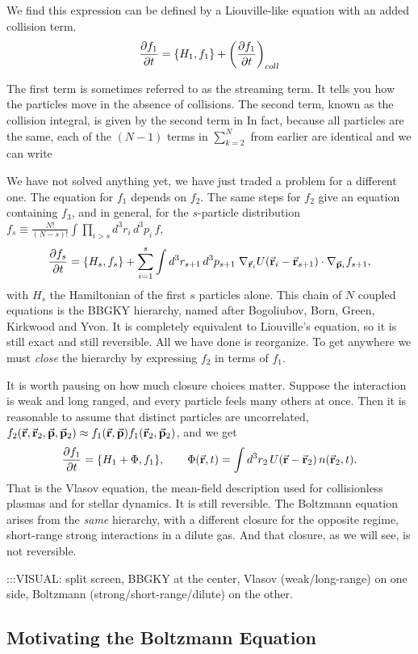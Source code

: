 We find this expression can be defined by a Liouville-like equation with an added collision term.
\[
\pdv{f_1}{t} = \pb{H_1}{f_1} + \left(\pdv{f_1}{t}  \right)_{coll}
  \]

  The first term is sometimes referred to as the streaming term. It tells you how the
particles move in the absence of collisions. The second term, known as the collision
integral, is given by the second term in In fact, because all particles are the
same, each of the $(N-1)$ terms in $\sum^N_{k=2}$ from earlier are identical and we can write

We have not solved anything yet, we have just traded a problem for a different one. The equation for $f_1$ depends on $f_2$. The same steps for $f_2$ give an equation containing $f_3$, and in general, for the $s$-particle distribution $f_s\equiv\frac{N!}{(N-s)!}\int\prod_{i>s}d^3r_i\,d^3p_i\,f$,
\[
\pdv{f_s}{t} = \pb{H_s}{f_s} + \sum_{i=1}^{s}\int d^3r_{s+1}\,d^3p_{s+1}\;\nabla_{\va r_i}U(\va r_i-\va r_{s+1})\cdot\nabla_{\va p_i}f_{s+1},
\]
with $H_s$ the Hamiltonian of the first $s$ particles alone. This chain of $N$ coupled equations is the BBGKY hierarchy, named after Bogoliubov, Born, Green, Kirkwood and Yvon. It is completely equivalent to Liouville's equation, so it is still exact and still reversible. All we have done is reorganize. To get anywhere we must \emph{close} the hierarchy by expressing $f_2$ in terms of $f_1$.

It is worth pausing on how much closure choices matter. Suppose the interaction is weak and long ranged, and every particle feels many others at once. Then it is reasonable to assume that distinct particles are uncorrelated, $f_2(\va r,\va r_2,\va p,\va p_2)\approx f_1(\va r,\va p)f_1(\va r_2,\va p_2)$, and we get
\[
\pdv{f_1}{t} = \pb{H_1+\Phi}{f_1}, \qquad \Phi(\va r,t)=\int d^3r_2\,U(\va r-\va r_2)\,n(\va r_2,t).
\]
That is the Vlasov equation, the mean-field description used for collisionless plasmas and for stellar dynamics. It is still reversible. The Boltzmann equation arises from the \emph{same} hierarchy, with a different closure for the opposite regime, short-range strong interactions in a dilute gas. And that closure, as we will see, is not reversible.

:::VISUAL: split screen, BBGKY at the center, Vlasov (weak/long-range) on one side, Boltzmann (strong/short-range/dilute) on the other.

\subsection{Motivating the Boltzmann Equation}

